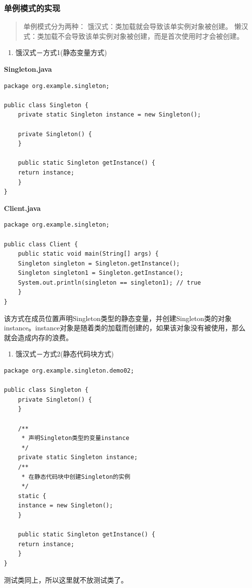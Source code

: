 \documentclass[11pt]{article}
\begin{document}
\subsubsection{单例模式的实现}
\label{sec:org7f7e835}
\begin{quote}
单例模式分为两种：
    饿汉式：类加载就会导致该单实例对象被创建。
    懒汉式：类加载不会导致该单实例对象被创建，而是首次使用时才会被创建。
\end{quote}

\begin{enumerate}
\item 饿汉式－方式1(静态变量方式)
\end{enumerate}

\textbf{Singleton.java}
\begin{verbatim}
package org.example.singleton;

public class Singleton {
    private static Singleton instance = new Singleton();

    private Singleton() {
    }

    public static Singleton getInstance() {
	return instance;
    }
}

\end{verbatim}

\textbf{Client.java}
\begin{verbatim}
package org.example.singleton;

public class Client {
    public static void main(String[] args) {
	Singleton singleton = Singleton.getInstance();
	Singleton singleton1 = Singleton.getInstance();
	System.out.println(singleton == singleton1); // true
    }
}

\end{verbatim}
该方式在成员位置声明Singleton类型的静态变量，并创建Singleton类的对象instance。instance对象是随着类的加载而创建的，如果该对象没有被使用，那么就会造成内存的浪费。


\begin{enumerate}
\item 饿汉式－方式2(静态代码块方式)
\end{enumerate}
\begin{verbatim}
package org.example.singleton.demo02;

public class Singleton {
    private Singleton() {
    }

    /**
     * 声明Singleton类型的变量instance
     */
    private static Singleton instance;
    /**
     * 在静态代码块中创建Singleton的实例
     */
    static {
	instance = new Singleton();
    }

    public static Singleton getInstance() {
	return instance;
    }
}
\end{verbatim}
测试类同上，所以这里就不放测试类了。
\end{document}
